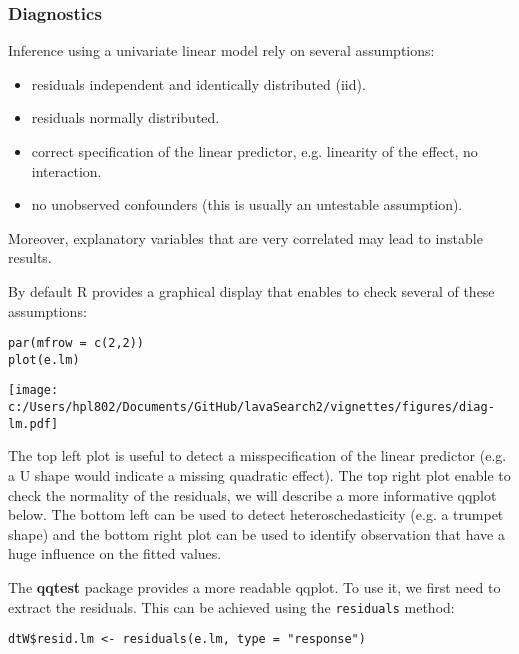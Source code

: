 \documentclass{article}
\begin{document}
\subsubsection{Diagnostics}
\label{sec:diagLM}
Inference using a univariate linear model rely on several assumptions:
\begin{itemize}
\item residuals independent and identically distributed (iid).
\item residuals normally distributed.
\item correct specification of the linear predictor, e.g. linearity of the effect, no interaction.
\item no unobserved confounders (this is usually an untestable
assumption).
\end{itemize}
Moreover, explanatory variables that are very correlated may lead to
instable results.

\bigskip

By default R provides a graphical display that enables to check
several of these assumptions:
\lstset{language=r,label= ,caption= ,captionpos=b,numbers=none}
\begin{lstlisting}
par(mfrow = c(2,2))
plot(e.lm)
\end{lstlisting}



\begin{center}
\texttt{[image: c:/Users/hpl802/Documents/GitHub/lavaSearch2/vignettes/figures/diag-lm.pdf]}
\end{center}

The top left plot is useful to detect a misspecification of the linear
predictor (e.g. a U shape would indicate a missing quadratic
effect). The top right plot enable to check the normality of the
residuals, we will describe a more informative qqplot below. The
bottom left can be used to detect heteroschedasticity (e.g. a trumpet
shape) and the bottom right plot can be used to identify observation
that have a huge influence on the fitted values.

\bigskip

The \textbf{qqtest} package provides a more readable qqplot. To use it, we
first need to extract the residuals. This can be achieved using the
\texttt{residuals} method:
\lstset{language=r,label= ,caption= ,captionpos=b,numbers=none}
\begin{lstlisting}
dtW$resid.lm <- residuals(e.lm, type = "response")
\end{lstlisting}
\end{document}
